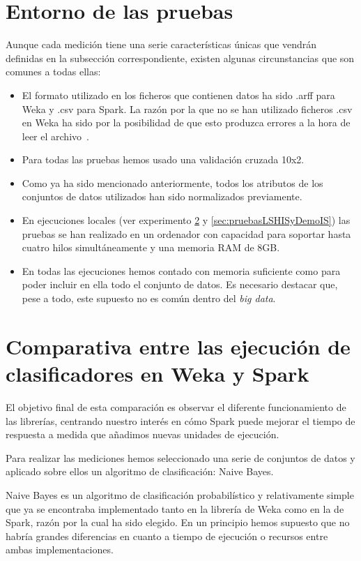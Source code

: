 \section{Entorno de las pruebas}

Aunque cada medición tiene una serie características únicas que vendrán definidas en la subsección correspondiente, existen algunas circunstancias que son comunes a todas ellas:

\begin{itemize}
	\item El formato utilizado en los ficheros que contienen datos ha sido .arff para Weka y .csv para Spark. La razón por la que no se han utilizado ficheros .csv en Weka ha sido por la posibilidad de que esto produzca errores a la hora de leer el archivo~\cite{CSVWeka}.
	\item Para todas las pruebas hemos usado una validación cruzada 10x2.
	\item Como ya ha sido mencionado anteriormente, todos los atributos de los conjuntos de datos utilizados han sido normalizados previamente.
	\item En ejecuciones locales (ver experimento \ref{sec:wekaSparkComp} y \ref{sec:pruebasLSHISyDemoIS}) las pruebas se han realizado en un ordenador con capacidad para soportar hasta cuatro hilos simultáneamente y una memoria RAM de 8GB.
	\item En todas las ejecuciones hemos contado con memoria suficiente como para poder incluir en ella todo el conjunto de datos. Es necesario destacar que, pese a todo, este supuesto no es común dentro del \textit{big data}.
	
\end{itemize}



\section{Comparativa entre las ejecución de clasificadores en Weka y Spark}\label{sec:wekaSparkComp}

El objetivo final de esta comparación es observar el diferente funcionamiento de las librerías, centrando nuestro interés en cómo Spark puede mejorar el tiempo de respuesta a medida que añadimos nuevas unidades de ejecución.

Para realizar las mediciones hemos seleccionado una serie de conjuntos de datos y aplicado sobre ellos un algoritmo de clasificación: Naive Bayes.

Naive Bayes es un algoritmo de clasificación probabilístico y relativamente simple que ya se encontraba implementado tanto en la librería de Weka como en la de Spark, razón por la cual ha sido elegido. En un principio hemos supuesto que no habría grandes diferencias en cuanto a tiempo de ejecución o recursos entre ambas implementaciones.

